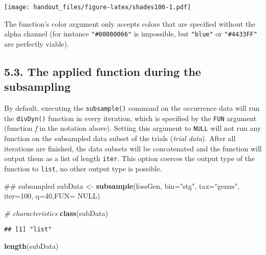 \documentclass[]{article}
\newenvironment{Shaded}{\begin{snugshade}}{\end{snugshade}}
\newcommand{\KeywordTok}[1]{\textcolor[rgb]{0.13,0.29,0.53}{\textbf{{#1}}}}
\newcommand{\DataTypeTok}[1]{\textcolor[rgb]{0.13,0.29,0.53}{{#1}}}
\newcommand{\DecValTok}[1]{\textcolor[rgb]{0.00,0.00,0.81}{{#1}}}
\newcommand{\StringTok}[1]{\textcolor[rgb]{0.31,0.60,0.02}{{#1}}}
\newcommand{\CommentTok}[1]{\textcolor[rgb]{0.56,0.35,0.01}{\textit{{#1}}}}
\newcommand{\OtherTok}[1]{\textcolor[rgb]{0.56,0.35,0.01}{{#1}}}
\newcommand{\NormalTok}[1]{{#1}}
\begin{document}
\texttt{[image: handout\_files/figure-latex/shades100-1.pdf]}

The function's color argument only accepts colors that are specified
without the alpha channel (for instance \texttt{"\#00000066"} is
impossible, but \texttt{"blue"} or \texttt{"\#4433FF"} are perfectly
viable).

\subsection{5.3. The applied function during the
subsampling}\label{the-applied-function-during-the-subsampling}

By default, executing the \texttt{subsample()} command on the occurrence
data will run the \texttt{divDyn()} function in every iteration, which
is specified by the \texttt{FUN} argument (function \emph{f} in the
notation above). Setting this argument to \texttt{NULL} will not run any
function on the subsampled data subset of the trials (\emph{trial
data}). After all iterations are finished, the data subsets will be
concatenated and the function will output them as a list of length
\texttt{iter}. This option coerces the output type of the function to
\texttt{list}, no other output type is possible.

\begin{Shaded}
\begin{Highlighting}[]
\NormalTok{## subsampled }
\NormalTok{subData <-}\StringTok{ }\KeywordTok{subsample}\NormalTok{(fossGen, }\DataTypeTok{bin=}\StringTok{"stg"}\NormalTok{, }\DataTypeTok{tax=}\StringTok{"genus"}\NormalTok{, }
  \DataTypeTok{iter=}\DecValTok{100}\NormalTok{, }\DataTypeTok{q=}\DecValTok{40}\NormalTok{,}\DataTypeTok{FUN=} \OtherTok{NULL}\NormalTok{)}
\end{Highlighting}
\end{Shaded}

\begin{Shaded}
\begin{Highlighting}[]
\CommentTok{# characteristics}
\KeywordTok{class}\NormalTok{(subData)}
\end{Highlighting}
\end{Shaded}

\begin{verbatim}
## [1] "list"
\end{verbatim}

\begin{Shaded}
\begin{Highlighting}[]
\KeywordTok{length}\NormalTok{(subData)}
\end{Highlighting}
\end{Shaded}
\end{document}
